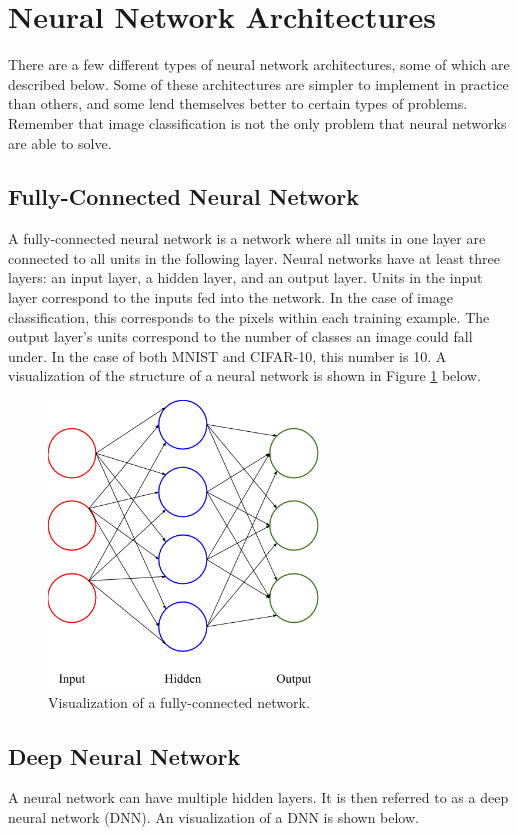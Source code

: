 \newpage
\section{Neural Network Architectures}\label{ch:neural_networks}
There are a few different types of neural network architectures, some of which
are described below. Some of these architectures are simpler to implement in
practice than others, and some lend themselves better to certain types of
problems. Remember that image classification is not the only problem that
neural networks are able to solve.

\subsection{Fully-Connected Neural Network}
A fully-connected neural network is a network where all units in one layer are
connected to all units in the following layer. Neural networks have at least
three layers: an input layer, a hidden layer, and an output layer. Units in the
input layer correspond to the inputs fed into the network. In the case of image
classification, this corresponds to the pixels within each training example.
The output layer's units correspond to the number of classes an image could
fall under. In the case of both MNIST and CIFAR-10, this number is 10.
A visualization of the structure of a neural network is shown in Figure
\ref{fig:nn} below.

\begin{figure}[ht!]
\centering
\includegraphics[height=3in]{../figures/neural_network.png}
\caption{Visualization of a fully-connected network.}
\label{fig:nn}
\end{figure}

\subsection{Deep Neural Network}
A neural network can have multiple hidden layers. It is then referred to as a
deep neural network (DNN). An visualization of a DNN is shown below.


